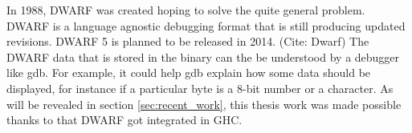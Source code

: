 In 1988, DWARF was created hoping to solve the quite general problem. DWARF is
a language agnostic debugging format that is still producing updated revisions.
DWARF 5 is planned to be released in 2014. (Cite: Dwarf) The DWARF data that is
stored in the binary can the be understood by a debugger like gdb. For example,
it could help gdb explain how some data should be displayed, for instance if a
particular byte is a 8-bit number or a character. As will be revealed in
section \ref{sec:recent_work}, this thesis work was made possible thanks
to that DWARF got integrated in GHC.

